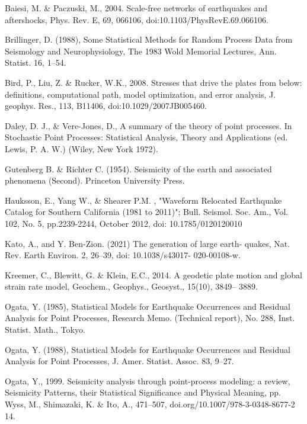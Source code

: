 \documentclass[12pt]{article} %
\theoremstyle{plain}
\begin{document}
	\newpage
	\begin{thebibliography}{99}  %

		Baiesi, M. \& Paczuski, M., 2004. Scale-free networks of earthquakes and aftershocks, Phys. Rev. E, 69, 066106, doi:10.1103/PhysRevE.69.066106.
		
		Brillinger, D. (1988), Some Statistical Methods for Random Process Data from Seismology and Neurophysiology, The 1983 Wold Memorial Lectures, Ann. Statist. 16, 1–54.
		
		Bird, P., Liu, Z. \& Rucker, W.K., 2008. Stresses that drive the plates from below: definitions, computational path, model optimization, and error analysis, J. geophys. Res., 113, B11406, doi:10.1029/2007JB005460.
		
		Daley, D. J., \& Vere-Jones, D., A summary of the theory of point processes. In Stochastic Point Processes: Statistical Analysis, Theory and Applications (ed. Lewis, P. A. W.) (Wiley, New York
		1972).
		
		Gutenberg B. \& Richter C. (1954). Seismicity of the earth and associated phenomena (Second). Princeton University Press.
		
		Hauksson, E., Yang W.,  \& Shearer P.M. , "Waveform Relocated Earthquake Catalog for Southern California (1981 to 2011)"; Bull. Seismol. Soc. Am., Vol. 102, No. 5, pp.2239-2244, October 2012, doi: 10.1785/0120120010
		
		Kato, A., and Y. Ben-Zion. (2021) 
		The generation of large earth- quakes, Nat. Rev. Earth Environ. 2, 26–39, doi: 10.1038/s43017- 020-00108-w.
		
		Kreemer, C., Blewitt, G. \& Klein, E.C., 2014. A geodetic plate motion and global strain rate model, Geochem., Geophys., Geosyst., 15(10), 3849– 3889.
		
		Ogata, Y. (1985), Statistical Models for Earthquake Occurrences and Residual Analysis for Point Processes, Research Memo. (Technical report), No. 288, Inst. Statist. Math., Tokyo.
		
		Ogata, Y. (1988), Statistical Models for Earthquake Occurrences and Residual Analysis for Point Processes, J. Amer. Statist. Assoc. 83, 9–27.
		
		Ogata, Y., 1999. Seismicity analysis through point-process modeling: a
		review, Seismicity Patterns, their Statistical Significance and Physical Meaning, pp. Wyss, M., Shimazaki, K. \& Ito, A., 471–507, doi.org/10.1007/978-3-0348-8677-2 14.
		

\end{thebibliography}
\end{document}
